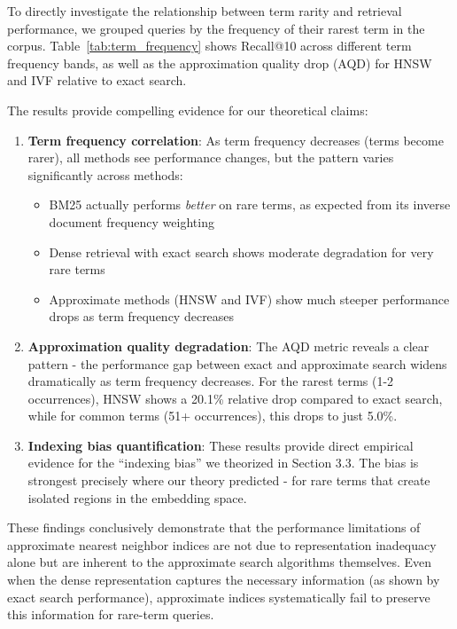 \documentclass[sigconf,review]{acmart}
\begin{document}
To directly investigate the relationship between term rarity and retrieval performance, we grouped queries by the frequency of their rarest term in the corpus. Table~\ref{tab:term_frequency} shows Recall@10 across different term frequency bands, as well as the approximation quality drop (AQD) for HNSW and IVF relative to exact search.

The results provide compelling evidence for our theoretical claims:

\begin{enumerate}
    \item \textbf{Term frequency correlation}: As term frequency decreases (terms become rarer), all methods see performance changes, but the pattern varies significantly across methods:
    \begin{itemize}
        \item BM25 actually performs \textit{better} on rare terms, as expected from its inverse document frequency weighting
        \item Dense retrieval with exact search shows moderate degradation for very rare terms
        \item Approximate methods (HNSW and IVF) show much steeper performance drops as term frequency decreases
    \end{itemize}
    
    \item \textbf{Approximation quality degradation}: The AQD metric reveals a clear pattern - the performance gap between exact and approximate search widens dramatically as term frequency decreases. For the rarest terms (1-2 occurrences), HNSW shows a 20.1\% relative drop compared to exact search, while for common terms (51+ occurrences), this drops to just 5.0\%.
    
    \item \textbf{Indexing bias quantification}: These results provide direct empirical evidence for the ``indexing bias'' we theorized in Section 3.3. The bias is strongest precisely where our theory predicted - for rare terms that create isolated regions in the embedding space.
\end{enumerate}

These findings conclusively demonstrate that the performance limitations of approximate nearest neighbor indices are not due to representation inadequacy alone but are inherent to the approximate search algorithms themselves. Even when the dense representation captures the necessary information (as shown by exact search performance), approximate indices systematically fail to preserve this information for rare-term queries.
\end{document}
